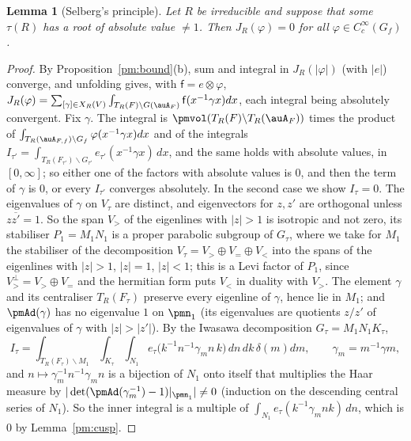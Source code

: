 \documentclass[10pt]{amsart}
\newtheorem{lemma}[theorem]{Lemma}
\theoremstyle{definition}
\theoremstyle{remark}
\providecommand{\aubar}[1]{\overline{#1}}
\begin{document}
\begin{lemma}[Selberg's principle]\label{pm:selberg}
Let $R$ be irreducible and suppose that some $\tau(R)$ has a root of absolute value $\ne1$. Then
$J_R(\varphi)=0$ for all $\varphi\in C_c^\infty(G_f)$.
\end{lemma}
\begin{proof}
By Proposition~\ref{pm:bound}(b), sum and integral in $J_R(|\varphi|)$ (with $|e|$) converge, and
unfolding gives, with $\mathsf f=e\otimes\varphi$, $J_R(\varphi)=\sum_{[\gamma]\in X_R(V)}\int_{T_R(F)\backslash G(\auA_F)}
\mathsf f(x^{-1}\gamma x)dx$, each integral being absolutely convergent. Fix $\gamma$. The integral is
$\pmvol(T_R(F)\backslash T_R(\auA_F))$ times the product of $\int_{T_R(\auA_{F,f})\backslash G_f}
\varphi(x^{-1}\gamma x)dx$ and of the integrals $I_{\tau'}=\int_{T_R(F_{\tau'})\backslash G_{\tau'}}
e_{\tau'}(x^{-1}\gamma x)\,dx$, and the same holds with absolute values, in $[0,\infty]$; so either one of the factors with
absolute values is $0$, and then the term of $\gamma$ is $0$, or every $I_{\tau'}$ converges
absolutely. In the second case we show $I_\tau=0$. The eigenvalues of
$\gamma$ on $V_\tau$ are distinct, and eigenvectors for $z,z'$ are orthogonal unless
$z\aubar{z'}=1$. So the span $V_>$ of the eigenlines with $|z|>1$ is isotropic and not zero, its
stabiliser $P_1=M_1N_1$ is a proper parabolic subgroup of $G_\tau$, where we take for $M_1$ the
stabiliser of the decomposition $V_\tau=V_>\oplus V_=\oplus V_<$ into the spans of the eigenlines
with $|z|>1$, $|z|=1$, $|z|<1$; this is a Levi factor of $P_1$, since $V_>^\perp=V_>\oplus V_=$ and
the hermitian form puts $V_<$ in duality with $V_>$. The element $\gamma$ and its centraliser
$T_R(F_\tau)$ preserve every eigenline of $\gamma$, hence lie in $M_1$; and $\pmAd(\gamma)$ has no eigenvalue $1$ on $\pmn_1$ (its eigenvalues
are quotients $z/z'$ of eigenvalues of $\gamma$ with $|z|>|z'|$). By the Iwasawa decomposition $G_\tau=M_1N_1K_\tau$,
\[
I_\tau=\int_{T_R(F_\tau)\backslash M_1}\int_{K_\tau}\int_{N_1}e_\tau\bigl(k^{-1}n^{-1}\gamma_mn\,k\bigr)
\,dn\,dk\,\delta(m)dm,\qquad\gamma_m=m^{-1}\gamma m,
\]
and $n\mapsto\gamma_m^{-1}n^{-1}\gamma_mn$ is a bijection of $N_1$ onto itself that multiplies the
Haar measure by $|\det(\pmAd(\gamma_m^{-1})-1)|_{\pmn_1}|\ne0$ (induction on the descending
central series of $N_1$). So the inner integral is a multiple of $\int_{N_1}e_\tau(k^{-1}\gamma_m
nk)\,dn$, which is $0$ by Lemma~\ref{pm:cusp}.
\end{proof}
\end{document}
